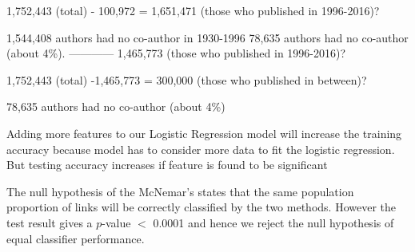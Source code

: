     1,752,443 (total) - 100,972 = 1,651,471 (those who published in 1996-2016)?
    
    1,544,408 authors had no co-author in 1930-1996
    78,635 authors had no co-author (about 4\%). 
    ------------
    1,465,773 (those who published in 1996-2016)?

    1,752,443 (total) -1,465,773 = 300,000 (those who published in between)?
    
    
78,635 authors had no co-author (about 4\%)

Adding more features to our Logistic Regression model will increase the training accuracy because model has to consider more data to fit the logistic regression. But testing accuracy increases if feature is found to be significant

The null hypothesis of the McNemar's states that the same population proportion of links will be correctly classified by the two methods. However the test result gives a $p$-value $<$ 0.0001 and hence we reject the null hypothesis of equal classifier performance.


